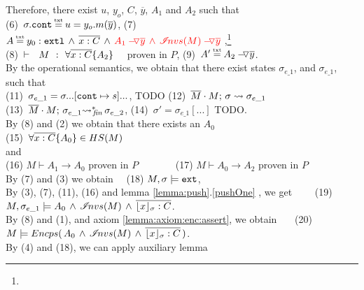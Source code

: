 \begin{description}
Therefore, there exist $u$, $y_o$, $C$, $\overline y$,  $A_1$ and $A_2$ such that \\
(6)\ $\sigma.\prg{cont}\txteq u=y_o.m(\overline y)$,  \hspace{2cm}
 (7)\ $A \txteq   { \external{y_0} }\, \wedge \, \overline {x:C}  \, \wedge \,  \red{\PushAS  {y}{  A_1} \,   \wedge \,  \PushAS {y}{\extract{M}}}\ $,\footnote{}
\\
 (8)\ ${\vdash \ \ M\ \ \mathbf{:}\ \ \forall {\overline {x:C}}{{\{}}{A_2}{{\}}}}$ \ \ proven in $P$,   \hspace{1cm}
 (9)\ $A' \txteq \PushAS  {y} { A_2}$. 
 \\
 By the operational semantics, we obtain that there exist states $\sigma_{e\_1}$, and $\sigma_{e\_1}$, such that \\
 (11)\ $\sigma_{e\_1}=\sigma ...[\mbox{\normalfont{\texttt{cont}}}\mapsto s]... $, TODO   \hspace{1cm}
   (12)\ $\overline{M}\cdot M;\, {\sigma} \rightsquigarrow \sigma_{e\_1}$ \\
 (13)\ $\overline{M}\cdot M;\, {\sigma_{e\_1}} {\rightsquigarrow^*}\!\!_{\mathit{fin}}\, \sigma_{e\_2}$,   \hspace{1cm}
 (14)\ $\sigma'=\sigma_{e\_1}[...]$ TODO.
\\
By (8) and (2) we obtain that there exists an $A_0$ \\
(15)\ $\forall {\overline {x:C}}{{\{}}{A_0}{{\}}}  \in HS(M)$\\ and \\
 (16) $M \vdash A_1 \rightarrow A_0$ proven in $P$ \ \ \ \ \ \ \  (17) $M \vdash A_0 \rightarrow A_2$ proven in $P$ \\
By (7) and (3) we obtain \ \ 
(18) $M, \sigma \models \mbox{\normalfont{\texttt{ext}}}$, %
\\
By (3), (7), (11), (16) and lemma  \ref{lemma:push}.\ref{pushOne} , we get \ \ \ \  (19) $M, \sigma_{e\_1} \models  {  A_0} \,   \wedge \,  {{\mathcal I}\!nvs(M)} \, \wedge \, 
\overline{ {\lfloor x \rfloor_{\sigma}} : C}$.
\\
By (8) and (1), and axiom \ref{lemma:axiom:enc:assert}, we obtain \ \ \ (20) \ $M \models {\ensuremath Encps(\, {  A_0} \,   \wedge \,  {\ensuremath{{\mathcal I}\!nvs(M)}} \, \wedge \, 
\overline{ {\lfloor x \rfloor_{\sigma}} : C}\, )}$.
\\
By (4) and (18), we can apply auxiliary lemma 

\end{description}
